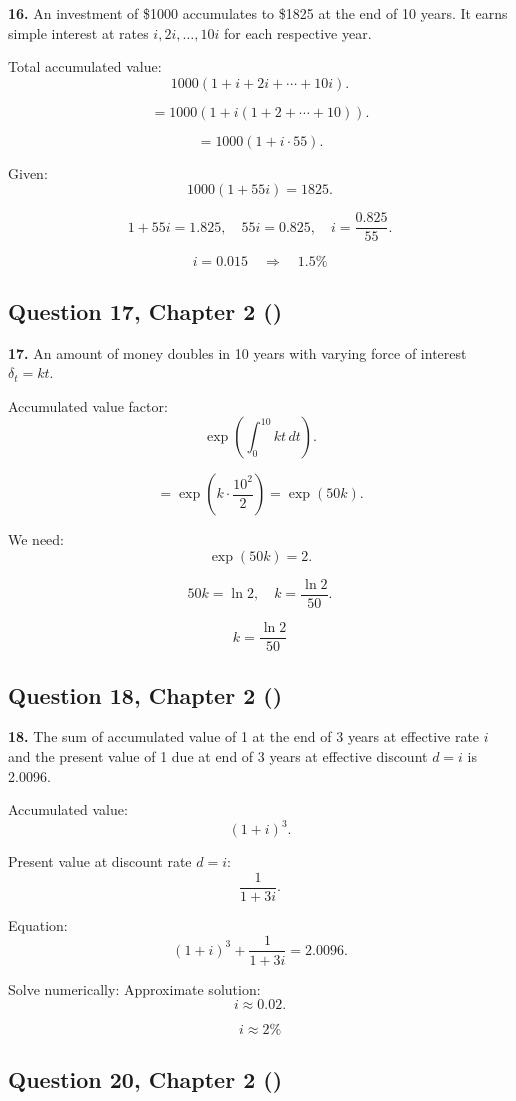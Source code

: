 \documentclass[12pt, a4paper]{article}
\begin{document}
\textbf{16.} An investment of \$1000 accumulates to \$1825 at the end of 10 years.  
It earns simple interest at rates \(i, 2i, \dots, 10i\) for each respective year.  

\bigskip
Total accumulated value:
\[
1000\left(1 + i + 2i + \cdots + 10i\right).
\]

\[
= 1000\left(1 + i(1+2+\cdots+10)\right).
\]

\[
= 1000\left(1 + i\cdot 55\right).
\]

Given:
\[
1000(1+55i) = 1825.
\]

\[
1+55i = 1.825, \quad 55i = 0.825, \quad i = \frac{0.825}{55}.
\]

\[
i = 0.015 \quad \Rightarrow \quad \boxed{1.5\%}
\]

\subsection*{Question 17, Chapter 2 (\cite{toi3rd})}

\textbf{17.} An amount of money doubles in 10 years with varying force of interest 
\(\delta_t = kt\).  

\bigskip
Accumulated value factor:
\[
\exp\!\left(\int_0^{10} kt \, dt \right).
\]

\[
= \exp\!\left( k \cdot \frac{10^2}{2} \right) = \exp(50k).
\]

We need:
\[
\exp(50k) = 2.
\]

\[
50k = \ln 2, \quad k = \frac{\ln 2}{50}.
\]

\[
\boxed{k = \frac{\ln 2}{50}}
\]

\subsection*{Question 18, Chapter 2 (\cite{toi3rd})}

\textbf{18.} The sum of accumulated value of 1 at the end of 3 years at effective rate \(i\) 
and the present value of 1 due at end of 3 years at effective discount \(d=i\) is 2.0096.  

\bigskip
Accumulated value:
\[
(1+i)^3.
\]

Present value at discount rate \(d=i\):
\[
\frac{1}{1+3i}.
\]

Equation:
\[
(1+i)^3 + \frac{1}{1+3i} = 2.0096.
\]

Solve numerically:  
Approximate solution:
\[
i \approx 0.02.
\]

\[
\boxed{i \approx 2\%}
\]

\subsection*{Question 20, Chapter 2 (\cite{toi3rd})}
\end{document}
